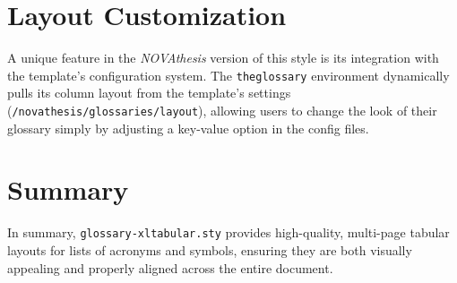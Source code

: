 \section{Layout Customization}
A unique feature in the \emph{NOVAthesis} version of this style is its integration with the template's configuration system. The \texttt{theglossary} environment dynamically pulls its column layout from the template's settings (\texttt{/novathesis/glossaries/layout}), allowing users to change the look of their glossary simply by adjusting a key-value option in the config files.

\section{Summary}
In summary, \texttt{glossary-xltabular.sty} provides high-quality, multi-page tabular layouts for lists of acronyms and symbols, ensuring they are both visually appealing and properly aligned across the entire document.
